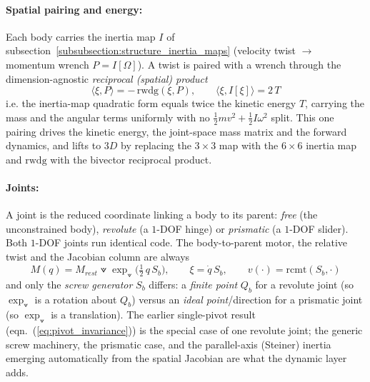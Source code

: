 \paragraph{Spatial pairing and energy:} Each body carries the inertia map $I$ of
subsection~\ref{subsubsection:structure_inertia_maps} (velocity twist $\to$ momentum
wrench $P = I[\Omega]$). A twist is paired with a wrench through the dimension-agnostic
\emph{reciprocal (spatial) product}
\begin{equation}
    \langle \xi, P \rangle = -\,\mathrm{rwdg}(\xi, P),
    \qquad \langle \xi, I[\xi] \rangle = 2\,T
    \label{eq:spatial_pairing}
\end{equation}
i.e. the inertia-map quadratic form equals twice the kinetic energy $T$, carrying the mass
and the angular terms uniformly with no $\tfrac12 m v^2 + \tfrac12 I \omega^2$ split. This
one pairing drives the kinetic energy, the joint-space mass matrix and the forward
dynamics, and lifts to $3D$ by replacing the $3\times3$ map with the $6\times6$ inertia
map and $\mathrm{rwdg}$ with the bivector reciprocal product.

\paragraph{Joints:} A joint is the reduced coordinate linking a body to its parent:
\emph{free} (the unconstrained body), \emph{revolute} (a $1$-DOF hinge) or \emph{prismatic}
(a $1$-DOF slider). Both $1$-DOF joints run identical code. The
body-to-parent motor, the relative twist and the Jacobian column are always
\begin{equation}
    M(q) = M_{\textit{rest}} \veedot \exp_\veedot\!\big(\tfrac12\, q\, S_b\big), \qquad
    \xi = \dot{q}\, S_b, \qquad
    v(\cdot) = \mathrm{rcmt}(S_b, \cdot)
    \label{eq:joint_motor}
\end{equation}
and only the \emph{screw generator} $S_b$ differs: a \emph{finite point} $Q_b$ for a
revolute joint (so $\exp_\veedot$ is a rotation about $Q_b$) versus an \emph{ideal
point}/direction for a prismatic joint (so $\exp_\veedot$ is a translation). The earlier
single-pivot result (eqn.~(\ref{eq:pivot_invariance})) is the special case of one revolute
joint; the generic screw machinery, the prismatic case, and the parallel-axis (Steiner)
inertia emerging automatically from the spatial Jacobian are what the dynamic layer adds.

